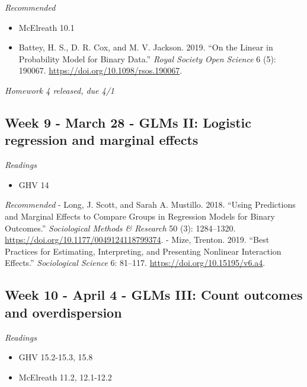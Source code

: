 \documentclass[
  10pt,
]{article}
\providecommand{\tightlist}{%
  \setlength{\itemsep}{0pt}\setlength{\parskip}{0pt}}
\begin{document}
\emph{Recommended}

\begin{itemize}
\tightlist
\item
  McElreath 10.1
\item
  Battey, H. S., D. R. Cox, and M. V. Jackson. 2019. ``On the Linear in
  Probability Model for Binary Data.'' \emph{Royal Society Open Science}
  6 (5): 190067. \url{https://doi.org/10.1098/rsos.190067}.
\end{itemize}

\emph{Homework 4 released, due 4/1}

\hypertarget{week-9---march-28---glms-ii-logistic-regression-and-marginal-effects}{%
\subsection{Week 9 - March 28 - GLMs II: Logistic regression and
marginal
effects}\label{week-9---march-28---glms-ii-logistic-regression-and-marginal-effects}}

\emph{Readings}

\begin{itemize}
\tightlist
\item
  GHV 14
\end{itemize}

\emph{Recommended} - Long, J. Scott, and Sarah A. Mustillo. 2018.
``Using Predictions and Marginal Effects to Compare Groups in Regression
Models for Binary Outcomes.'' \emph{Sociological Methods \& Research} 50
(3): 1284--1320. \url{https://doi.org/10.1177/0049124118799374}. - Mize,
Trenton. 2019. ``Best Practices for Estimating, Interpreting, and
Presenting Nonlinear Interaction Effects.'' \emph{Sociological Science}
6: 81--117. \url{https://doi.org/10.15195/v6.a4}.

\hypertarget{week-10---april-4---glms-iii-count-outcomes-and-overdispersion}{%
\subsection{Week 10 - April 4 - GLMs III: Count outcomes and
overdispersion}\label{week-10---april-4---glms-iii-count-outcomes-and-overdispersion}}

\emph{Readings}

\begin{itemize}
\tightlist
\item
  GHV 15.2-15.3, 15.8
\item
  McElreath 11.2, 12.1-12.2
\end{itemize}
\end{document}
